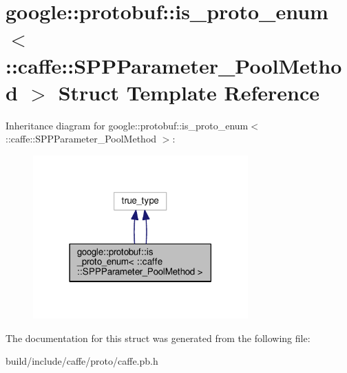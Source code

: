 \hypertarget{structgoogle_1_1protobuf_1_1is__proto__enum_3_01_1_1caffe_1_1_s_p_p_parameter___pool_method_01_4}{}\section{google\+:\+:protobuf\+:\+:is\+\_\+proto\+\_\+enum$<$ \+:\+:caffe\+:\+:S\+P\+P\+Parameter\+\_\+\+Pool\+Method $>$ Struct Template Reference}
\label{structgoogle_1_1protobuf_1_1is__proto__enum_3_01_1_1caffe_1_1_s_p_p_parameter___pool_method_01_4}


Inheritance diagram for google\+:\+:protobuf\+:\+:is\+\_\+proto\+\_\+enum$<$ \+:\+:caffe\+:\+:S\+P\+P\+Parameter\+\_\+\+Pool\+Method $>$\+:
\nopagebreak
\begin{figure}[H]
\begin{center}
\leavevmode
\includegraphics[width=234pt]{structgoogle_1_1protobuf_1_1is__proto__enum_3_01_1_1caffe_1_1_s_p_p_parameter___pool_method_01_4__inherit__graph}
\end{center}
\end{figure}


The documentation for this struct was generated from the following file\+:\begin{DoxyCompactItemize}
\item 
build/include/caffe/proto/caffe.\+pb.\+h\end{DoxyCompactItemize}
